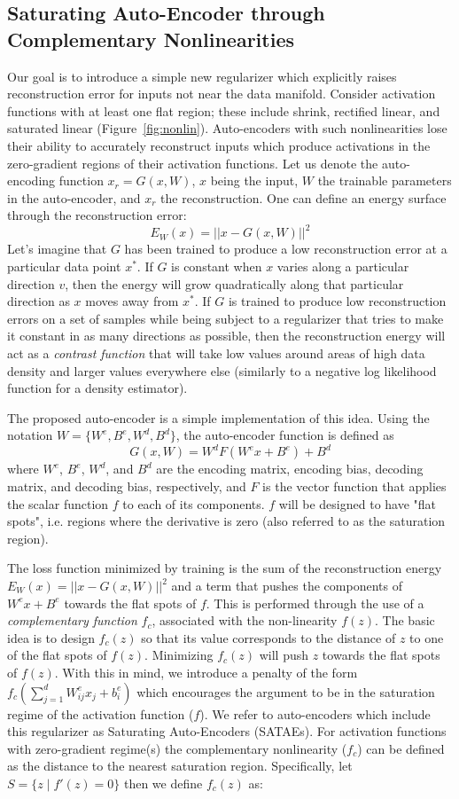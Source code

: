 \documentclass{article} %
\begin{document}
\subsection{Saturating Auto-Encoder through Complementary Nonlinearities}     
Our goal is to introduce a simple new regularizer which explicitly raises reconstruction error for inputs not near the data manifold. Consider activation functions with at least one flat region; these include shrink, rectified linear, and saturated linear (Figure~\ref{fig:nonlin}). Auto-encoders with such nonlinearities lose their ability to accurately reconstruct inputs which produce activations in the zero-gradient regions of their activation functions. Let us denote the auto-encoding function $x_r = G(x,W)$, $x$ being the input, $W$ the trainable parameters in the auto-encoder, and $x_r$ the reconstruction. One can define an energy surface
through the reconstruction error:
\[
  E_W(x) = ||x-G(x,W)||^2
\]
Let's imagine that $G$ has been trained to produce a low reconstruction error at a particular data point $x^*$. If $G$ is constant when $x$ varies along a particular direction $v$, then the energy will grow quadratically along that particular direction as $x$ moves away from $x^*$. If $G$ is trained to produce low reconstruction errors on a set of samples while being subject to a regularizer that tries to make it constant in as many directions as possible, then the reconstruction energy will act as a {\em contrast function} that will take low values around areas of high data density and larger values everywhere else (similarly to a negative log likelihood function for a density estimator).

The proposed auto-encoder is a simple implementation of this idea. 
Using the notation $W =\{W^e,B^e,W^d,B^d\}$, the auto-encoder function is defined as
\[
  G(x,W) = W^d F(W^e x+B^e) + B^d
\]
where $W^e$, $B^e$, $W^d$, and $B^d$ are the encoding matrix, encoding bias, decoding matrix, and decoding bias, respectively, and $F$ is the vector function that applies the scalar function $f$ to each of its components. $f$ will be designed to have "flat spots", i.e. regions where the derivative is zero (also referred to as the saturation region).

The loss function minimized by training is the sum of the reconstruction energy $E_W(x)=||x-G(x,W)||^2$ and a term that pushes the components of $W^e x + B^e$ towards the flat spots of $f$. This is performed through the use of a {\em complementary function} $f_c$, associated with the non-linearity $f(z)$. The basic idea is to design $f_c(z)$ so that its value corresponds to the distance of $z$ to one of the flat spots of $f(z)$. Minimizing $f_c(z)$ will push $z$ towards the flat spots of $f(z)$. With this in mind, we introduce a penalty of the form $f_c(\sum_{j=1}^d W^e_{ij}x_j + b^e_i)$ which encourages the argument to be in the saturation regime of the activation function ($f$). We refer to auto-encoders which include this regularizer as Saturating Auto-Encoders (SATAEs). For activation functions with zero-gradient regime(s) the complementary nonlinearity ($f_c$) can be defined as the distance to the nearest saturation region. Specifically, let $S = \{z \mid  f'(z) = 0\}$ then we define $f_c(z)$ as: 
\end{document}
